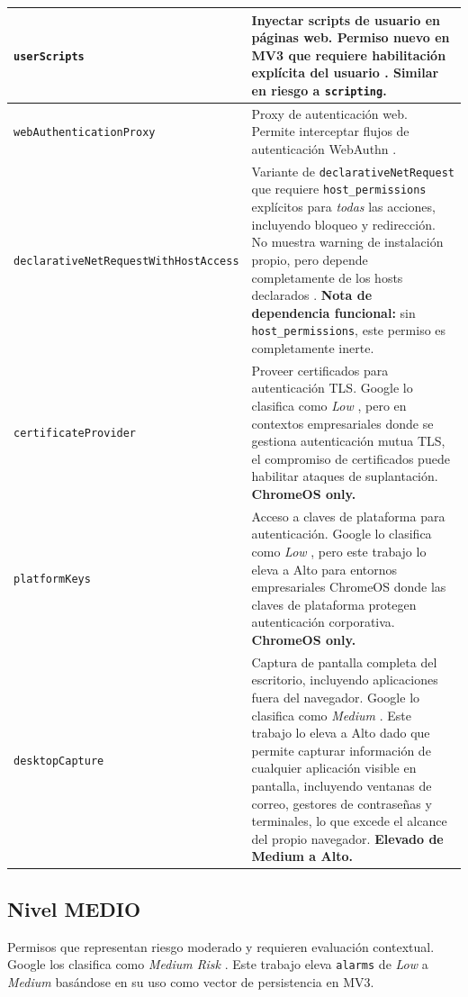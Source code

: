 \documentclass[12pt,oneside]{report}
\begin{document}
\begin{xltabular}{\textwidth}{|p{4.2cm}|X|}
\texttt{userScripts} & Inyectar scripts de usuario en páginas web. Permiso nuevo en MV3 que requiere habilitación explícita del usuario \cite{chrome_permissions_list}. Similar en riesgo a \texttt{scripting}. \\
\hline
\texttt{webAuthenticationProxy} & Proxy de autenticación web. Permite interceptar flujos de autenticación WebAuthn \cite{chrome_permissions_list}. \\
\hline
\texttt{declarativeNetRequest\-WithHostAccess} & Variante de \texttt{declarativeNetRequest} que requiere \texttt{host\_permissions} explícitos para \textit{todas} las acciones, incluyendo bloqueo y redirección. No muestra warning de instalación propio, pero depende completamente de los hosts declarados \cite{chrome_permissions_list}. \textbf{Nota de dependencia funcional:} sin \texttt{host\_permissions}, este permiso es completamente inerte. \\
\hline
\texttt{certificateProvider} & Proveer certificados para autenticación TLS. Google lo clasifica como \textit{Low} \cite{google_permission_risk}, pero en contextos empresariales donde se gestiona autenticación mutua TLS, el compromiso de certificados puede habilitar ataques de suplantación. \textbf{ChromeOS only.} \\
\hline
\texttt{platformKeys} & Acceso a claves de plataforma para autenticación. Google lo clasifica como \textit{Low} \cite{google_permission_risk}, pero este trabajo lo eleva a Alto para entornos empresariales ChromeOS donde las claves de plataforma protegen autenticación corporativa. \textbf{ChromeOS only.} \\
\hline
\texttt{desktopCapture} & Captura de pantalla completa del escritorio, incluyendo aplicaciones fuera del navegador. Google lo clasifica como \textit{Medium} \cite{google_permission_risk}. Este trabajo lo eleva a Alto dado que permite capturar información de cualquier aplicación visible en pantalla, incluyendo ventanas de correo, gestores de contraseñas y terminales, lo que excede el alcance del propio navegador. \textbf{Elevado de Medium a Alto.} \\
\hline
\end{xltabular}
\endgroup

\subsection{Nivel MEDIO}

Permisos que representan riesgo moderado y requieren evaluación contextual. Google los clasifica como \textit{Medium Risk} \cite{google_permission_risk}. Este trabajo eleva \texttt{alarms} de \textit{Low} a \textit{Medium} basándose en su uso como vector de persistencia en MV3.
\end{document}
